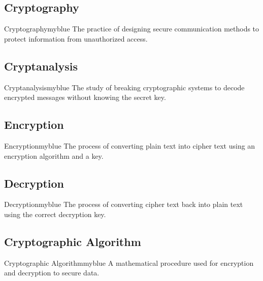 \vspace{0.25cm}

\subsection{Cryptography}
\begin{prettyBox}{Cryptography}{myblue}
The practice of designing secure communication methods to protect information from unauthorized access.
\end{prettyBox}

\vspace{0.25cm}
\subsection{Cryptanalysis}
\begin{prettyBox}{Cryptanalysis}{myblue}
The study of breaking cryptographic systems to decode encrypted messages without knowing the secret key.
\end{prettyBox}

\vspace{0.25cm}
\subsection{Encryption}
\begin{prettyBox}{Encryption}{myblue}
The process of converting plain text into cipher text using an encryption algorithm and a key.
\end{prettyBox}

\vspace{0.25cm}
\subsection{Decryption}
\begin{prettyBox}{Decryption}{myblue}
The process of converting cipher text back into plain text using the correct decryption key.
\end{prettyBox}

\vspace{0.25cm}
\subsection{Cryptographic Algorithm}
\begin{prettyBox}{Cryptographic Algorithm}{myblue}
A mathematical procedure used for encryption and decryption to secure data.
\end{prettyBox}

